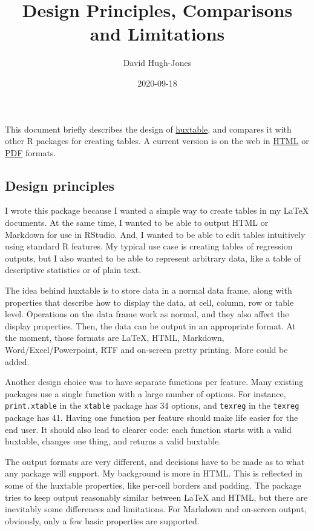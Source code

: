 \documentclass[]{article}
\title{Design Principles, Comparisons and Limitations}
\author{David Hugh-Jones}
\date{2020-09-18}
\begin{document}
\maketitle

This document briefly describes the design of
\href{https://hughjonesd.github.io/huxtable}{huxtable}, and compares it
with other R packages for creating tables. A current version is on the
web in
\href{https://hughjonesd.github.io/huxtable/design-principles.html}{HTML}
or
\href{https://hughjonesd.github.io/huxtable/design-principles.pdf}{PDF}
formats.

\hypertarget{design-principles}{%
\subsection{Design principles}\label{design-principles}}

I wrote this package because I wanted a simple way to create tables in
my LaTeX documents. At the same time, I wanted to be able to output HTML
or Markdown for use in RStudio. And, I wanted to be able to edit tables
intuitively using standard R features. My typical use case is creating
tables of regression outputs, but I also wanted to be able to represent
arbitrary data, like a table of descriptive statistics or of plain text.

The idea behind huxtable is to store data in a normal data frame, along
with properties that describe how to display the data, at cell, column,
row or table level. Operations on the data frame work as normal, and
they also affect the display properties. Then, the data can be output in
an appropriate format. At the moment, those formats are LaTeX, HTML,
Markdown, Word/Excel/Powerpoint, RTF and on-screen pretty printing. More
could be added.

Another design choice was to have separate functions per feature. Many
existing packages use a single function with a large number of options.
For instance, \texttt{print.xtable} in the \texttt{xtable} package has
34 options, and \texttt{texreg} in the \texttt{texreg} package has 41.
Having one function per feature should make life easier for the end
user. It should also lead to clearer code: each function starts with a
valid huxtable, changes one thing, and returns a valid huxtable.

The output formats are very different, and decisions have to be made as
to what any package will support. My background is more in HTML. This is
reflected in some of the huxtable properties, like per-cell borders and
padding. The package tries to keep output reasonably similar between
LaTeX and HTML, but there are inevitably some differences and
limitations. For Markdown and on-screen output, obviously, only a few
basic properties are supported.
\end{document}
